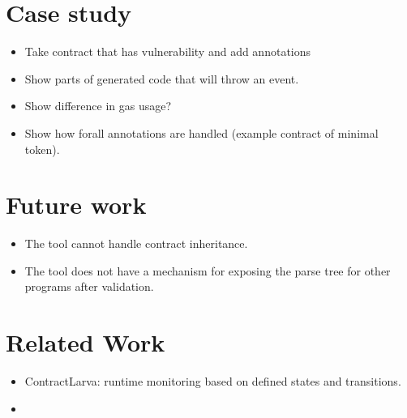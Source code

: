 \documentclass[a4paper]{article}
\begin{document}
\section{Case study}
\begin{itemize}
  \item Take contract that has vulnerability and add annotations
  \item Show parts of generated code that will throw an event.
  \item Show difference in gas usage?
  \item Show how forall annotations are handled (example contract of minimal token).
\end{itemize}

\section{Future work}
\begin{itemize}
  \item The tool cannot handle contract inheritance.
  \item The tool does not have a mechanism for exposing the parse tree for other programs after validation.
\end{itemize}

\section{Related Work}
\begin{itemize}
  \item ContractLarva: runtime monitoring based on defined states and transitions.
  \item 
\end{itemize}
\end{document}
